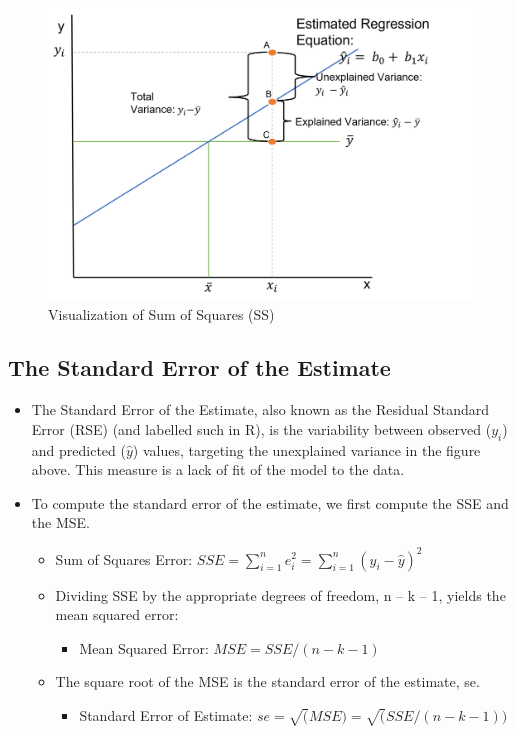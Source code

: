 \documentclass[
  letterpaper,
  DIV=11,
  numbers=noendperiod]{scrreprt}
\providecommand{\tightlist}{%
  \setlength{\itemsep}{0pt}\setlength{\parskip}{0pt}}\usepackage{longtable,booktabs,array}
\begin{document}
\begin{figure}[H]

{\centering \includegraphics{Pictures/Ch9/SS.png}

}

\caption{Visualization of Sum of Squares (SS)}

\end{figure}%

\subsection{The Standard Error of the
Estimate}\label{the-standard-error-of-the-estimate}

\begin{itemize}
\tightlist
\item
  The Standard Error of the Estimate, also known as the Residual
  Standard Error (RSE) (and labelled such in R), is the variability
  between observed (\(y_i\)) and predicted (\(\hat{y}\)) values,
  targeting the unexplained variance in the figure above. This measure
  is a lack of fit of the model to the data.
\item
  To compute the standard error of the estimate, we first compute the
  SSE and the MSE.

  \begin{itemize}
  \tightlist
  \item
    Sum of Squares Error:
    \(SSE = \sum^n_{i=1}e^2_i = \sum^n_{i=1}(y_i - \hat{y})^2\)
  \item
    Dividing SSE by the appropriate degrees of freedom, n -- k -- 1,
    yields the mean squared error:

    \begin{itemize}
    \tightlist
    \item
      Mean Squared Error: \(MSE = SSE/(n-k-1)\)
    \end{itemize}
  \item
    The square root of the MSE is the standard error of the estimate,
    se.

    \begin{itemize}
    \tightlist
    \item
      Standard Error of Estimate:
      \(se = \sqrt(MSE) = \sqrt(SSE/(n-k-1))\)
    \end{itemize}
  \end{itemize}
\end{itemize}
\end{document}
